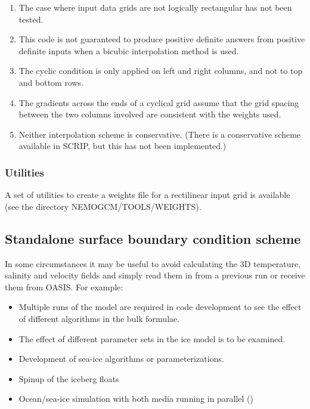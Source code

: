 \documentclass[../tex_main/NEMO_manual]{subfiles}
\begin{document}
\begin{enumerate}  
\item
  The case where input data grids are not logically rectangular has not been tested.
\item
  This code is not guaranteed to produce positive definite answers from positive definite inputs when
  a bicubic interpolation method is used.
\item
  The cyclic condition is only applied on left and right columns, and not to top and bottom rows.
\item
  The gradients across the ends of a cyclical grid assume that the grid spacing between
  the two columns involved are consistent with the weights used.
\item
  Neither interpolation scheme is conservative. (There is a conservative scheme available in SCRIP,
  but this has not been implemented.)
\end{enumerate}

\subsubsection{Utilities}
\label{subsec:SBC_iof_util}

A set of utilities to create a weights file for a rectilinear input grid is available
(see the directory NEMOGCM/TOOLS/WEIGHTS).

\subsection{Standalone surface boundary condition scheme}
\label{subsec:SAS_iof}



In some circumstances it may be useful to avoid calculating the 3D temperature,
salinity and velocity fields and simply read them in from a previous run or receive them from OASIS.  
For example:

\begin{itemize}
\item
  Multiple runs of the model are required in code development to
  see the effect of different algorithms in the bulk formulae.
\item
  The effect of different parameter sets in the ice model is to be examined.
\item
  Development of sea-ice algorithms or parameterizations.
\item
  Spinup of the iceberg floats
\item
  Ocean/sea-ice simulation with both media running in parallel ()
\end{itemize}
\end{document}
